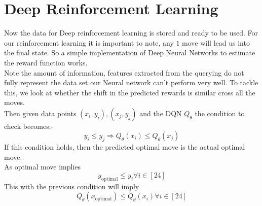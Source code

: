 \section{Deep Reinforcement Learning}
Now the data for Deep reinforcement learning is stored and ready to be used. For our reinforcement learning it is important to note, any $1$ move will lead us into the final state. So a simple implementation of Deep Neural Networks to estimate the reward function works.\\
Note the amount of information, features extracted from the querying do not fully represent the data set our Neural network can't perform very well. To tackle this, we look at whether the shift in the predicted rewards is similar cross all the moves.\\
Then given data points $(x_{i},y_{i}),(x_{j},y_{j})$ and the DQN $Q_{\theta}$ the condition to check becomes:-
$$y_{i}\leq y_{j}\Rightarrow Q_{\theta}(x_{i})\leq Q_{\theta}(x_{j})$$
If this condition holds, then the predicted optimal move is the actual optimal move. \\
As optimal move implies
$$y_{\text{optimal}}\leq y_{i} \forall i \in [24]$$
This with the previous condition will imply
$$Q_{\theta}(x_{\text{optimal}})\leq Q_{\theta}(x_{i})\forall i \in [24]$$ 

